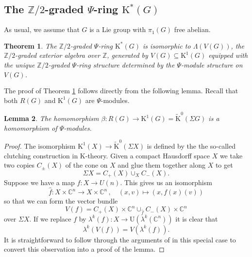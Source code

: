 \documentclass[twoside,a4paper,reqno,11pt]{amsart}
\newtheorem{lemma}{Lemma}[subsection]
\newtheorem{theorem}[lemma]{Theorem}
\newcommand{\C}{\mathbb{C}}
\newcommand{\K}{\mathrm{K}}
\newcommand{\Z}{\mathbb{Z}}
\newcommand{\U}{\mathrm{U}}
\begin{document}
\subsection{The $\Z/2$-graded $\Psi$-ring $\K^*(G)$}
As usual, we assume that  $G$ is a Lie group with $\pi_1(G)$ free abelian.  

\begin{theorem} \label{thm:Z2gradedringisos}
The $\Z/2$-graded $\Psi$-ring $\K^*(G)$ is isomorphic to $\Lambda(V(G))$, the $\Z/2$-graded exterior algebra over $\Z$, generated by $V(G) \subseteq \K^1(G)$ equipped with the unique $\Z/2$-graded $\Psi$-ring structure determined by the $\Psi$-module structure on $V(G)$.  
\end{theorem}

The proof of Theorem \ref{thm:Z2gradedringisos} follows directly from the following lemma. Recall that both $R(G)$ and $\K^1(G)$ are $\Psi$-modules. 
\begin{lemma} \label{lem:homofpsimodules}
The homomorphism $\beta: R(G) \to \K^1(G) = \tilde{\K}^0(\Sigma G)$ is a homomorphism of $\Psi$-modules.
\end{lemma}

\begin{proof} 
The isomorphism $\K^1(X) \to \tilde{\K}^0(\Sigma X)$ is defined by the the so-called clutching construction in $\K$-theory.  Given a compact Hausdorff space $X$ we take two copies $C_\pm(X)$ of the cone on $X$ and glue them together along $X$ to get
$$
\Sigma X = C_+(X ) \cup_X C_-(X).
$$
Suppose we have a map $f : X \to U(n)$. This gives us an isomorphism
$$
\hat{f} : X \times \C^n \to X \times \C^n \, , \quad (x,v) \mapsto (x, f(x)(v))
$$
so that we can form the vector bundle
$$
V(f) = C_+(X ) \times \C^n \cup_{\hat{f}}  C_-(X) \times \C^n
$$
over $\Sigma X$.  If we replace $f$ by $\lambda^k(f):  X  \to \U(\lambda^k(\C^n))$  it is clear that
$$
\lambda^k(V(f)) = V(\lambda^k(f)).
$$
It is straightforward to follow through the arguments of \cite[Chapter~3, Section~3.1]{atiyah2018k} in this special case to convert this observation into a proof of the lemma.
\end{proof}
\end{document}
